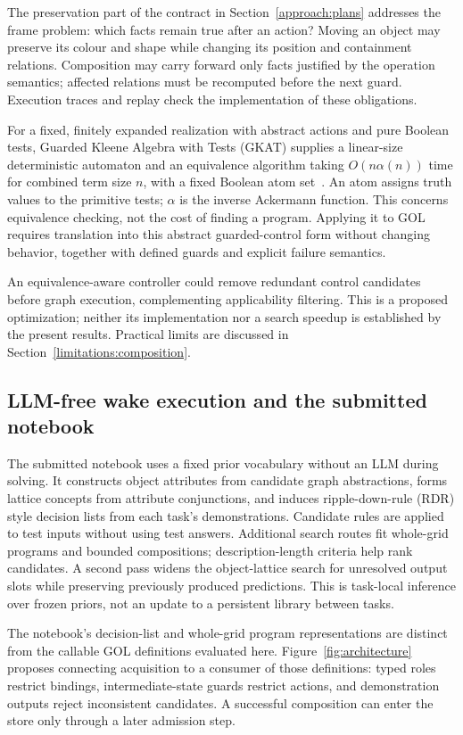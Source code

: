 \documentclass[11pt]{article}
\begin{document}
The preservation part of the contract in Section~\ref{approach:plans} addresses the frame problem: which facts remain true after an action? Moving an object may preserve its colour and shape while changing its position and containment relations. Composition may carry forward only facts justified by the operation semantics; affected relations must be recomputed before the next guard. Execution traces and replay check the implementation of these obligations.

For a fixed, finitely expanded realization with abstract actions and pure Boolean tests, Guarded Kleene Algebra with Tests (GKAT) supplies a linear-size deterministic automaton and an equivalence algorithm taking $O(n\alpha(n))$ time for combined term size $n$, with a fixed Boolean atom set~\cite[Proposition 4.2 and Theorem 5.10]{gkat}. An atom assigns truth values to the primitive tests; $\alpha$ is the inverse Ackermann function. This concerns equivalence checking, not the cost of finding a program. Applying it to GOL requires translation into this abstract guarded-control form without changing behavior, together with defined guards and explicit failure semantics.

An equivalence-aware controller could remove redundant control candidates before graph execution, complementing applicability filtering. This is a proposed optimization; neither its implementation nor a search speedup is established by the present results. Practical limits are discussed in Section~\ref{limitations:composition}.

\subsection{LLM-free wake execution and the submitted notebook}\label{approach:wake}
The submitted notebook uses a fixed prior vocabulary without an LLM during solving. It constructs object attributes from candidate graph abstractions, forms lattice concepts from attribute conjunctions, and induces ripple-down-rule (RDR) style decision lists from each task's demonstrations. Candidate rules are applied to test inputs without using test answers. Additional search routes fit whole-grid programs and bounded compositions; description-length criteria help rank candidates. A second pass widens the object-lattice search for unresolved output slots while preserving previously produced predictions. This is task-local inference over frozen priors, not an update to a persistent library between tasks.

The notebook's decision-list and whole-grid program representations are distinct from the callable GOL definitions evaluated here. Figure~\ref{fig:architecture} proposes connecting acquisition to a consumer of those definitions: typed roles restrict bindings, intermediate-state guards restrict actions, and demonstration outputs reject inconsistent candidates. A successful composition can enter the store only through a later admission step.
\end{document}
